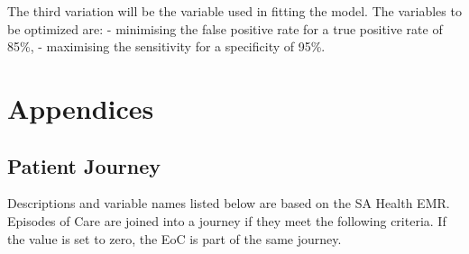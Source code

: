 \documentclass[
  a4paper,
  ,captions=tableheading
]{scrartcl}
\begin{document}
The third variation will be the variable used in fitting the model. The
variables to be optimized are: - minimising the false positive rate for
a true positive rate of 85\%, - maximising the sensitivity for a
specificity of 95\%.

\newpage

\section{Appendices}\label{appendices}

\subsection{Patient Journey}\label{sec:Journey}

Descriptions and variable names listed below are based on the SA Health
EMR. Episodes of Care are joined into a journey if they meet the
following criteria. If the value is set to zero, the EoC is part of the
same journey.
\end{document}
